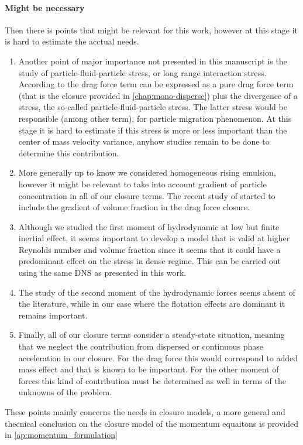 \paragraph*{Might be necessary}
Then there is points that might be relevant for this work, however at this stage it is hard to estimate the acctual needs.
\begin{enumerate}
    \item Another point of major importance not presented in this manuscript is the study of particle-fluid-particle stress, or long range interaction stress. 
    According to \cite{Lhuillier_2009,nott2011suspension,zhang2021ensemble} the drag force term can be expressed as a pure drag force term (that is the closure provided in \ref{chap:mono-disperse}) plus the divergence of a stress, the so-called particle-fluid-particle stress. 
    The latter stress would be responsible (among other term), for particle migration phenomenon.  
    At this stage it is hard to estimate if this stress is more or less important than the center of mass velocity variance, anyhow studies remain to be done to determine this contribution. 
    \item More generally up to know we considered homogeneous rising emulsion, however it might be relevant to take into account gradient of particle concentration in all of our closure terms. 
    The recent study of \citet{wang2024effect} started to include the gradient of volume fraction in the drag force closure. 
    \item Although we studied the first moment of hydrodynamic at low but finite inertial effect, it seems important to develop a model that is valid at higher Reynolds number and volume fraction since it seems that it could have a predominant effect on the stress in dense regime. 
    This can be carried out using the same DNS as presented in this work. 
    \item The study of the second moment of the hydrodynamic forces seems absent of the literature, while in our case where the flotation effects are dominant it remains important. 
    \item Finally, all of our closure terms consider a steady-state situation, meaning that we neglect the contribution from dispersed or continuous phase acceleration in our closure. 
    For the drag force this would correspond to added mass effect and that is known to be important. 
    For the other moment of forces this kind of contribution must be determined as well in terms of the unknowns of the problem. 
\end{enumerate}
These points mainly concerns the needs in closure models, a more general and thecnical conclusion on the closure model of the momentum equaitons is provided in \ref{ap:momentum_formulation} 


